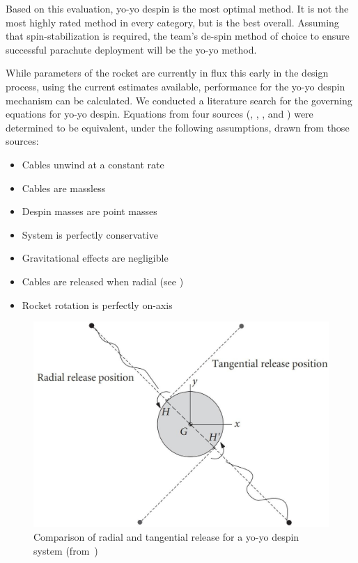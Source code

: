 Based on this evaluation, yo-yo despin is the most optimal method. It is not the most highly rated method in every category, but is the best overall. Assuming that spin-stabilization is required, the team's de-spin method of choice to ensure successful parachute deployment will be the yo-yo method.

While parameters of the rocket are currently in flux this early in the design process, using the current estimates available, performance for the yo-yo despin mechanism can be calculated. We conducted a literature search for the governing equations for yo-yo despin. Equations from four sources (\cite{curtis-orbital-mech}, \cite{eom-despin-dtic}, \cite{intro-attitude-dynamics}, and \cite{princeton-course}) were determined to be equivalent, under the following assumptions, drawn from those sources:

\begin{itemize}
    \item Cables unwind at a constant rate
    \item Cables are massless
    \item Despin masses are point masses
    \item System is perfectly conservative
    \item Gravitational effects are negligible
    \item Cables are released when radial (see )
    \item Rocket rotation is perfectly on-axis
\end{itemize}

\begin{figure}
    \centering
    \includegraphics[width=0.75\linewidth]{images/tangential-radial}
    \caption{Comparison of radial and tangential release for a yo-yo despin system (from~\cite{curtis-orbital-mech})}
    \label{figure:tangential-radial}
\end{figure}


